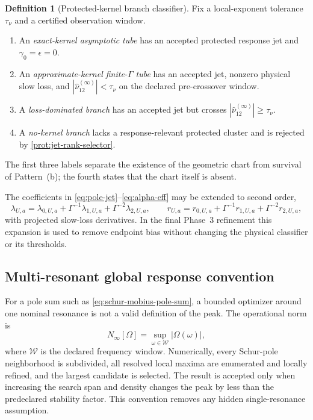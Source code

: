 \documentclass[11pt]{article}
\theoremstyle{definition}
\newtheorem{definition}[theorem]{Definition}
\theoremstyle{remark}
\begin{document}
\begin{definition}[Protected-kernel branch classifier]\label{def:kernel-branch}
Fix a local-exponent tolerance $\tau_\nu$ and a certified observation window.
\begin{enumerate}
  \item An \emph{exact-kernel asymptotic tube} has an accepted protected response jet and $\gamma_0=\epsilon=0$.
  \item An \emph{approximate-kernel finite-$\Gamma$ tube} has an accepted jet, nonzero physical slow loss, and $|\widehat\nu_{12}^{(\infty)}|<\tau_\nu$ on the declared pre-crossover window.
  \item A \emph{loss-dominated branch} has an accepted jet but crosses $|\widehat\nu_{12}^{(\infty)}|\ge\tau_\nu$.
  \item A \emph{no-kernel branch} lacks a response-relevant protected cluster and is rejected by \cref{prot:jet-rank-selector}.
\end{enumerate}
The first three labels separate the existence of the geometric chart from survival of Pattern~(b); the fourth states that the chart itself is absent.
\end{definition}

The coefficients in \eqref{eq:pole-jet}--\eqref{eq:alpha-eff} may be extended to second order,
\begin{equation}
 \lambda_{U,a}
 =\lambda_{0,U,a}
 +\Gamma^{-1}\lambda_{1,U,a}
 +\Gamma^{-2}\lambda_{2,U,a},
 \qquad
 r_{U,a}
 =r_{0,U,a}
 +\Gamma^{-1}r_{1,U,a}
 +\Gamma^{-2}r_{2,U,a},
 \label{eq:second-order-schur-jet}
\end{equation}
with projected slow-loss derivatives.  In the final Phase~3 refinement this expansion is used to remove endpoint bias without changing the physical classifier or its thresholds.

\subsection{Multi-resonant global response convention}

For a pole sum such as \eqref{eq:schur-mobius-pole-sum}, a bounded optimizer around one nominal resonance is not a valid definition of the peak.  The operational norm is
\begin{equation}
 N_\infty[\Omega]
 =\sup_{\omega\in\mathcal W}|\Omega(\omega)|,
 \label{eq:global-ninf}
\end{equation}
where $\mathcal W$ is the declared frequency window.  Numerically, every Schur-pole neighborhood is subdivided, all resolved local maxima are enumerated and locally refined, and the largest candidate is selected.  The result is accepted only when increasing the search span and density changes the peak by less than the predeclared stability factor.  This convention removes any hidden single-resonance assumption.
\end{document}
